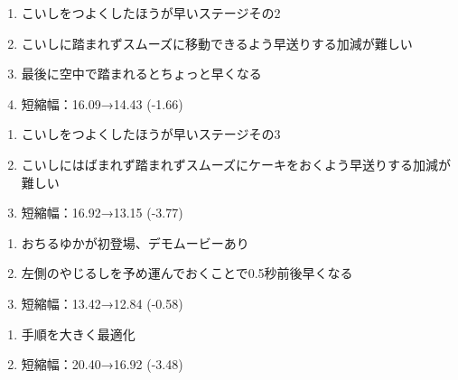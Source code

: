 \begin{enumerate}[label={\sarrow}]
\item こいしをつよくしたほうが早いステージその2
\item こいしに踏まれずスムーズに移動できるよう早送りする加減が難しい
\item 最後に空中で踏まれるとちょっと早くなる
\item 短縮幅：16.09→14.43 (-1.66)
\end{enumerate}



\begin{enumerate}[label={\sarrow}]
\item こいしをつよくしたほうが早いステージその3
\item こいしにはばまれず踏まれずスムーズにケーキをおくよう早送りする加減が難しい
\item 短縮幅：16.92→13.15 (-3.77)
\end{enumerate}



\begin{enumerate}[label={\sarrow}]
\item おちるゆかが初登場、デモムービーあり
\item 左側のやじるしを予め運んでおくことで0.5秒前後早くなる
\item 短縮幅：13.42→12.84 (-0.58)
\end{enumerate}



\begin{enumerate}[label={\sarrow}]
\item 手順を大きく最適化
\item 短縮幅：20.40→16.92 (-3.48)
\end{enumerate}



